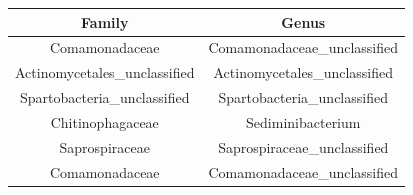 \documentclass[]{article}
\begin{document}
\begin{longtable}[]{@{}cc@{}}
\toprule
\begin{minipage}[b]{0.41\columnwidth}\centering
Family\strut
\end{minipage} & \begin{minipage}[b]{0.41\columnwidth}\centering
Genus\strut
\end{minipage}\tabularnewline
\midrule
\endhead
\begin{minipage}[t]{0.41\columnwidth}\centering
Comamonadaceae\strut
\end{minipage} & \begin{minipage}[t]{0.41\columnwidth}\centering
Comamonadaceae\_unclassified\strut
\end{minipage}\tabularnewline
\begin{minipage}[t]{0.41\columnwidth}\centering
Actinomycetales\_unclassified\strut
\end{minipage} & \begin{minipage}[t]{0.41\columnwidth}\centering
Actinomycetales\_unclassified\strut
\end{minipage}\tabularnewline
\begin{minipage}[t]{0.41\columnwidth}\centering
Spartobacteria\_unclassified\strut
\end{minipage} & \begin{minipage}[t]{0.41\columnwidth}\centering
Spartobacteria\_unclassified\strut
\end{minipage}\tabularnewline
\begin{minipage}[t]{0.41\columnwidth}\centering
Chitinophagaceae\strut
\end{minipage} & \begin{minipage}[t]{0.41\columnwidth}\centering
Sediminibacterium\strut
\end{minipage}\tabularnewline
\begin{minipage}[t]{0.41\columnwidth}\centering
Saprospiraceae\strut
\end{minipage} & \begin{minipage}[t]{0.41\columnwidth}\centering
Saprospiraceae\_unclassified\strut
\end{minipage}\tabularnewline
\begin{minipage}[t]{0.41\columnwidth}\centering
Comamonadaceae\strut
\end{minipage} & \begin{minipage}[t]{0.41\columnwidth}\centering
Comamonadaceae\_unclassified\strut
\end{minipage}\tabularnewline

\end{longtable}
\end{document}
